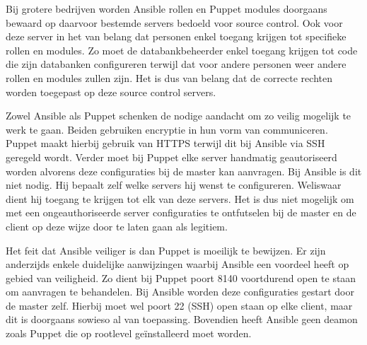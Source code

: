 Bij grotere bedrijven worden Ansible rollen en Puppet modules doorgaans bewaard op daarvoor bestemde servers bedoeld voor source control. Ook voor deze server in het van belang dat personen enkel toegang krijgen tot specifieke rollen en modules. Zo moet de databankbeheerder enkel toegang krijgen tot code die zijn databanken configureren terwijl dat voor andere personen weer andere rollen en modules zullen zijn. Het is dus van belang dat de correcte rechten worden toegepast op deze source control servers.

Zowel Ansible als Puppet schenken de nodige aandacht om zo veilig mogelijk te werk te gaan. Beiden gebruiken encryptie in hun vorm van communiceren. Puppet maakt hierbij gebruik van HTTPS terwijl dit bij Ansible via SSH geregeld wordt. Verder moet bij Puppet elke server handmatig geautoriseerd worden alvorens deze configuraties bij de master kan aanvragen. Bij Ansible is dit niet nodig. Hij bepaalt zelf welke servers hij wenst te configureren. Weliswaar dient hij toegang te krijgen tot elk van deze servers. Het is dus niet mogelijk om met een ongeauthoriseerde server configuraties te ontfutselen bij de master en de client op deze wijze door te laten gaan als legitiem. 

Het feit dat Ansible veiliger is dan Puppet is moeilijk te bewijzen. Er zijn anderzijds enkele duidelijke aanwijzingen waarbij Ansible een voordeel heeft op gebied van veiligheid. Zo dient bij Puppet poort 8140 voortdurend open te staan om aanvragen te behandelen. Bij Ansible worden deze configuraties gestart door de master zelf. Hierbij moet wel poort 22 (SSH) open staan op elke client, maar dit is doorgaans sowieso al van toepassing. Bovendien heeft Ansible geen deamon zoals Puppet die op rootlevel geïnstalleerd moet worden.



